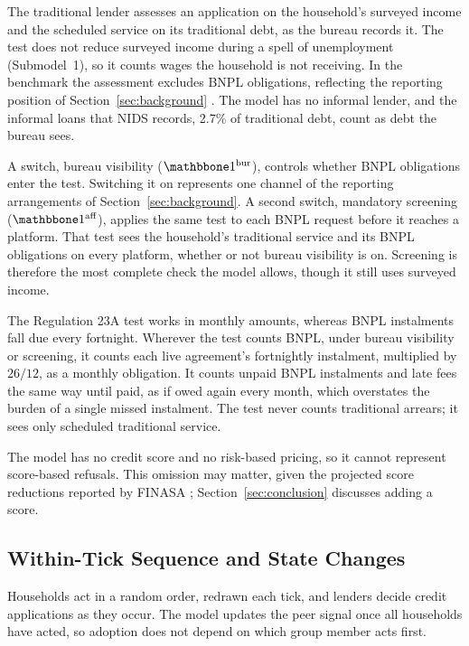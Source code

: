 The traditional lender assesses an application on the household's surveyed income
and the scheduled service on its traditional debt, as the bureau records it. The test does not
reduce surveyed income during a spell of unemployment (Submodel~1), so it counts wages the
household is not receiving. In the benchmark the assessment excludes \ac{BNPL}
obligations, reflecting the reporting position of Section~\ref{sec:background}
\citep{dcasa_bnpl_2026,finasa_bnpl_2026}. The model has no informal lender, and
the informal loans that \ac{NIDS} records, 2.7\% of traditional debt, count as debt the
bureau sees.

A switch, bureau visibility ($\ind^{\text{bur}}$), controls whether \ac{BNPL} obligations enter the
test. Switching it on represents one channel of the
reporting arrangements of Section~\ref{sec:background}. A second switch,
mandatory screening ($\ind^{\text{aff}}$), applies the same test to each
\ac{BNPL} request before it reaches a platform. That test sees the household's traditional
service and its \ac{BNPL} obligations on every platform, whether or not bureau visibility is
on. Screening is therefore the most complete check the model allows, though it still uses
surveyed income.

The Regulation 23A test works in monthly amounts, whereas \ac{BNPL} instalments fall due
every fortnight. Wherever the test counts \ac{BNPL}, under bureau visibility or screening, it
counts each live agreement's fortnightly instalment, multiplied by $26/12$, as a monthly
obligation. It counts unpaid \ac{BNPL} instalments and late fees the same way until paid, as
if owed again every month, which overstates the burden of a single missed instalment. The test
never counts traditional arrears; it sees only scheduled traditional service.

The model has no credit
score and no risk-based pricing, so it cannot represent score-based refusals. This omission
may matter, given the projected score reductions reported by \ac{FINASA}
\citeyearpar{finasa_bnpl_2026}; Section~\ref{sec:conclusion} discusses adding a score.

\subsection{Within-Tick Sequence and State Changes}
\label{sec:sequence}

Households act in a random order, redrawn each tick, and lenders decide credit applications as
they occur. The model updates the peer signal once all households have acted, so adoption does
not depend on which group member acts first.

